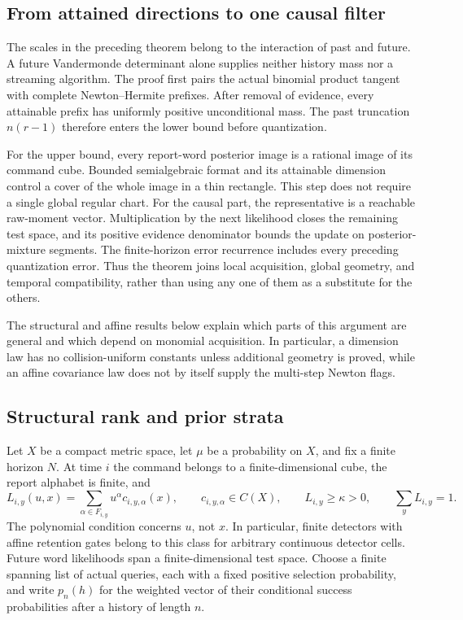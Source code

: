 \subsection{From attained directions to one causal filter}
The scales in the preceding theorem belong to the interaction of past
and future. A future Vandermonde determinant alone supplies neither
history mass nor a streaming algorithm. The proof first pairs the
actual binomial product tangent with complete Newton--Hermite prefixes.
After removal of evidence, every attainable prefix has uniformly
positive unconditional mass. The past truncation $n(r-1)$ therefore
enters the lower bound before quantization.

For the upper bound, every report-word posterior image is a rational
image of its command cube. Bounded semialgebraic format and its
attainable dimension control a cover of the whole image in a thin
rectangle. This step does not require a single global regular chart.
For the causal part, the representative is a reachable raw-moment
vector. Multiplication by the next likelihood closes the remaining test
space, and its positive evidence denominator bounds the update on
posterior-mixture segments. The finite-horizon error recurrence includes
every preceding quantization error. Thus the theorem joins local
acquisition, global geometry, and temporal compatibility, rather than
using any one of them as a substitute for the others.

The structural and affine results below explain which parts of this
argument are general and which depend on monomial acquisition. In
particular, a dimension law has no collision-uniform constants unless
additional geometry is proved, while an affine covariance law does not
by itself supply the multi-step Newton flags.

\subsection{Structural rank and prior strata}

Let $X$ be a compact metric space, let $\mu$ be a probability on $X$,
and fix a finite horizon $N$. At time $i$ the command belongs to a
finite-dimensional cube, the report alphabet is finite, and
\[
 L_{i,y}(u,x)=\sum_{\alpha\in F_{i,y}}u^\alpha c_{i,y,\alpha}(x),
 \qquad c_{i,y,\alpha}\in C(X),\qquad L_{i,y}\ge\kappa>0,
 \qquad\sum_yL_{i,y}=1.
\]
The polynomial condition concerns $u$, not $x$. In particular, finite
detectors with affine retention gates belong to this class for arbitrary
continuous detector cells. Future word likelihoods span a
finite-dimensional test space. Choose a finite spanning list of actual
queries, each with a fixed positive selection probability, and write
$p_n(h)$ for the weighted vector of their conditional success
probabilities after a history of length $n$.

